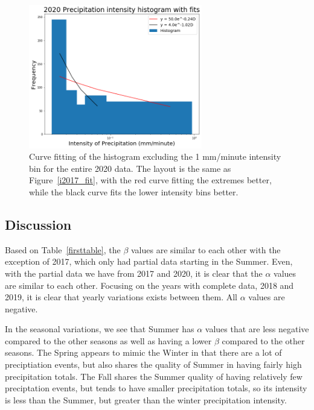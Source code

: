 \documentclass[11pt]{report}
\begin{document}
\begin{figure}[b]
	\centering
	\includegraphics[width=0.675\textwidth]{Figures/inten2020_fit.png}
	\caption[Fitting Intensity histogram for 2020 with different bins]
	{\label{i2020_fit} Curve fitting of the histogram excluding the 1 mm/minute intensity bin for the entire 2020 data. The layout is the same as Figure~\ref{i2017_fit}, with the red curve fitting the extremes better, while the black curve fits the lower intensity bins better.  }
\end{figure}

\clearpage


\subsection{Discussion}\label{sec:apcd}




Based on Table~\ref{firsttable}, the $\beta$ values are similar to
each other with the exception of 2017, which only had partial data
starting in the Summer. Even, with the partial data we have from 2017
and 2020, it is clear that the $\alpha$ values are similar to each
other. Focusing on the years with complete data, 2018 and 2019, it is
clear that yearly variations exists between them. All $\alpha$ values
are negative.

In the seasonal variations, we see that Summer has $\alpha$ values
that are less negative compared to the other seasons as well as having
a lower $\beta$ compared to the other seasons. 
The Spring appears to mimic the Winter in that there are a lot of
preciptiation events, but also shares the quality of Summer in having
fairly high precipitation totals. The Fall shares the Summer quality
of having relatively few preciptation events, but tends to have
smaller precipitation totals, so its intensity is less than the
Summer, but greater than the winter precipitation intensity.
\end{document}
